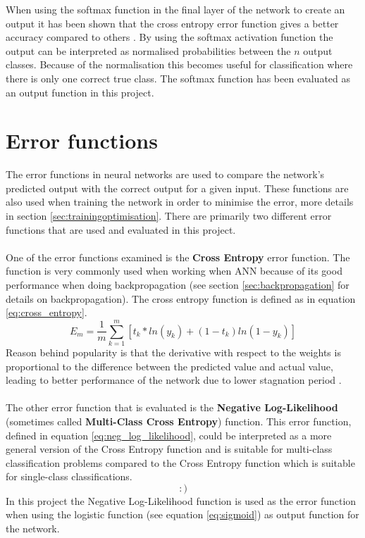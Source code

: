 When using the softmax function in the final layer of the network to create an output it has been shown that the cross entropy error function gives a better accuracy compared to others \parencite{dunne1997pairing,golik2013cross}. By using the softmax activation function the output can be interpreted as normalised probabilities between the $n$ output classes. Because of the normalisation this becomes useful for classification where there is only one correct true class. The softmax function has been evaluated as an output function in this project.

\section{Error functions} \label{errorfunction}
The error functions in neural networks are used to compare the network's predicted output with the correct output for a given input. These functions are also used when training the network in order to minimise the error, more details in section \ref{sec:trainingoptimisation}. There are primarily two different error functions that are used and evaluated in this project.
\\\\
One of the error functions examined is the \textbf{Cross Entropy} error function. The function is very commonly used when working when ANN because of its good performance when doing backpropagation (see section \ref{sec:backpropagation} for details on backpropagation). The cross entropy function is defined as in equation \ref{eq:cross_entropy}.
\begin{equation} \label{eq:cross_entropy}
    E_m = \frac{1}{m}\sum_{k=1}^{m} [t_k * ln(y_k) +(1-t_k)ln(1-y_k) ]
\end{equation}
Reason behind popularity is that the derivative with respect to the weights is proportional to the difference between the predicted value and actual value, leading to better performance of the network due to lower stagnation period \parencite{nasr2002cross}.
\\\\
The other error function that is evaluated is the \textbf{Negative Log-Likelihood} (sometimes called \textbf{Multi-Class Cross Entropy}) function. This error function, defined in equation \ref{eq:neg_log_likelihood}, could be interpreted as a more general version of the Cross Entropy function and is suitable for multi-class classification problems compared to the Cross Entropy function which is suitable for single-class classifications.
\begin{equation} \label{eq:neg_log_likelihood}
    :)
\end{equation}
In this project the Negative Log-Likelihood function is used as the error function when using the logistic function (see equation \ref{eq:sigmoid}) as output function for the network.

